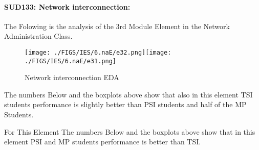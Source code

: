 \documentclass[12pt]{extreport}
\begin{document}


\paragraph{\large SUD133: Network interconnection:\\
}
The Folowing is the analysis of the 3rd Module Element in the Network Administration Class.
\begin{figure}[H]
	\centering
	\texttt{[image: ./FIGS/IES/6.naE/e32.png]}\texttt{[image: ./FIGS/IES/6.naE/e31.png]}
	\caption{Network interconnection EDA}
	\label{fig:74}
\end{figure}
The numbers Below and the boxplots above show that also in this element  TSI students performance is slightly better than PSI students and half of the MP Students.

For This Element The numbers Below and the boxplots above show that in this element  PSI and MP students performance is  better than TSI.

\begin{comment}
\subparagraph{Interpretation of the Box-plots:}
For This Element 

\begin{enumerate}	
	\item The MP Class Box-Plot:
	\begin{enumerate}
		\item MAX = a {} {} {} {} {} {} {} {} UQ = b {} {} {} {} {} {} {} {} Median = c
		\item LQ = d {} {} {} {} {} {} {} {}  MIN =	l {} {} {} {} {} {} {} {}  IQR = e - f = g
	\end{enumerate}
	\item The PSI Class Box-Plot:
	\begin{enumerate}
		\item MAX = a {} {} {} {} {} {} {} {} UQ = b {} {} {} {} {} {} {} {} Median = c
		\item LQ = d {} {} {} {} {} {} {} {}  MIN =	e {} {} {} {} {} {} {} {} IQR = f - g = h	
	\end{enumerate}
	\item The TSI Class Box-Plot:
	\begin{enumerate}
		\item MAX = a {} {} {} {} {} {} {} {} UQ = b {} {} {} {} {} {} {} {} Median = c
		\item LQ = d {} {} {} {} {} {} {} {} MIN = e {} {} {} {} {} {} {} {} IQR = f - g = h	
	\end{enumerate}
\end{enumerate}

\subparagraph{Interpretation of the histogram:}
This Frequency Distribution is (Skeness) with the following descriptive statistics:
\begin{enumerate}
	\item Mean = 
	\item STD = 
	\item Range = a - b = c
	\item IQR = a-b = c 
\end{enumerate}
\end{comment}
\end{document}
